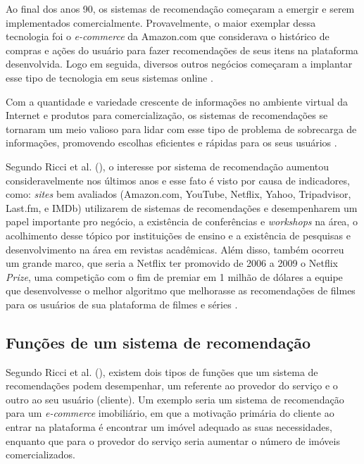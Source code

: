 Ao final dos anos 90, os sistemas de recomendação começaram a emergir e serem implementados comercialmente. Provavelmente, o maior exemplar dessa tecnologia foi o \textit{e-commerce} da Amazon.com que considerava o histórico de compras e ações do usuário para fazer recomendações de seus itens na plataforma desenvolvida. Logo em seguida, diversos outros negócios começaram a implantar esse tipo de tecnologia em seus sistemas online \cite{Ekstrand:2011:CFR:2185827.2185828}.

Com a quantidade e variedade crescente de informações no ambiente virtual da Internet e produtos para comercialização, os sistemas de recomendações se tornaram um meio valioso para lidar com esse tipo de problema de sobrecarga de informações, promovendo escolhas eficientes e rápidas para os seus usuários \cite{Ricci:2010}.

Segundo Ricci et al. (\citeyear{Ricci:2010}), o interesse por sistema de recomendação aumentou consideravelmente nos últimos anos e esse fato é visto por causa de  indicadores, como: \textit{sites} bem avaliados (Amazon.com, YouTube, Netflix, Yahoo, Tripadvisor, Last.fm, e IMDb) utilizarem de sistemas de recomendações e desempenharem um papel importante pro negócio, a existência de conferências e \textit{workshops} na área, o acolhimento desse tópico por instituições de ensino e a existência de pesquisas e desenvolvimento na área em revistas acadêmicas. Além disso, também ocorreu um grande marco, que seria a Netflix ter promovido de 2006 a 2009 o Netflix \textit{Prize}, uma competição com o fim de premiar em 1 milhão de dólares a equipe que desenvolvesse o melhor algoritmo que melhorasse as recomendações de filmes para os usuários de sua plataforma de filmes e séries \cite{netflixprize:2009}.

\subsection{Funções de um sistema de recomendação}

Segundo Ricci et al. (\citeyear{Ricci:2010}), existem dois tipos de funções que um sistema de recomendações podem desempenhar, um referente ao provedor do serviço e o outro ao seu usuário (cliente). Um exemplo seria um sistema de recomendação para um \textit{e-commerce} imobiliário, em que a motivação primária do cliente ao entrar na plataforma é encontrar um imóvel adequado as suas necessidades, enquanto que para o provedor do serviço seria aumentar o número de imóveis comercializados.


